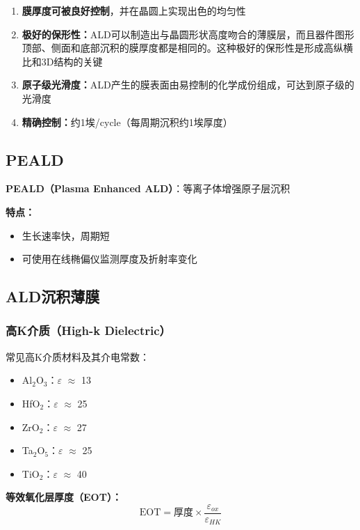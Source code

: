 \documentclass[UTF8,12pt,a4paper]{ctexart}
\begin{document}
\begin{enumerate}
    \item \textbf{膜厚度可被良好控制}，并在晶圆上实现出色的均匀性
    \item \textbf{极好的保形性：}ALD可以制造出与晶圆形状高度吻合的薄膜层，而且器件图形顶部、侧面和底部沉积的膜厚度都是相同的。这种极好的保形性是形成高纵横比和3D结构的关键
    \item \textbf{原子级光滑度：}ALD产生的膜表面由易控制的化学成份组成，可达到原子级的光滑度
    \item \textbf{精确控制：}约1埃/cycle（每周期沉积约1埃厚度）
\end{enumerate}

\subsection{PEALD}

\textbf{PEALD（Plasma Enhanced ALD）}：等离子体增强原子层沉积

\textbf{特点：}
\begin{itemize}
    \item 生长速率快，周期短
    \item 可使用在线椭偏仪监测厚度及折射率变化
\end{itemize}

\subsection{ALD沉积薄膜}

\subsubsection{高K介质（High-k Dielectric）}

常见高K介质材料及其介电常数：

\begin{itemize}
    \item Al$_2$O$_3$：$\varepsilon$ $\approx$ 13
    \item HfO$_2$：$\varepsilon$ $\approx$ 25
    \item ZrO$_2$：$\varepsilon$ $\approx$ 27
    \item Ta$_2$O$_5$：$\varepsilon$ $\approx$ 25
    \item TiO$_2$：$\varepsilon$ $\approx$ 40
\end{itemize}

\textbf{等效氧化层厚度（EOT）：}
\begin{equation}
\text{EOT} = \text{厚度} \times \frac{\varepsilon_{ox}}{\varepsilon_{HK}}
\end{equation}
\end{document}
